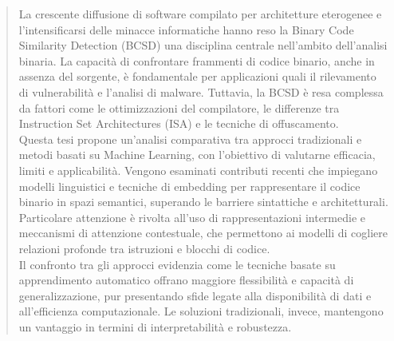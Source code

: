 \documentclass[12pt,a4paper,openright,twoside]{report}
\begin{document}

\restoregeometry


\newpage
\thispagestyle{empty}
\mbox{}
\newpage



\restoregeometry

\clearpage{\pagestyle{empty}\cleardoublepage}
\renewcommand{\abstractname}{Abstract}
{}
\begin{abstract}
   La crescente diffusione di software compilato per architetture eterogenee e l’intensificarsi delle minacce informatiche hanno reso la Binary Code Similarity Detection (BCSD) una disciplina centrale nell’ambito dell’analisi binaria. La capacità di confrontare frammenti di codice binario, anche in assenza del sorgente, è fondamentale per applicazioni quali il rilevamento di vulnerabilità e l’analisi di malware. Tuttavia, la BCSD è resa complessa da fattori come le ottimizzazioni del compilatore, le differenze tra Instruction Set Architectures (ISA) e le tecniche di offuscamento.\\ Questa tesi propone un’analisi comparativa tra approcci tradizionali e metodi basati su Machine Learning, con l’obiettivo di valutarne efficacia, limiti e applicabilità. Vengono esaminati contributi recenti che impiegano modelli linguistici e tecniche di embedding per rappresentare il codice binario in spazi semantici, superando le barriere sintattiche e architetturali. Particolare attenzione è rivolta all’uso di rappresentazioni intermedie e meccanismi di attenzione contestuale, che permettono ai modelli di cogliere relazioni profonde tra istruzioni e blocchi di codice. \\Il confronto tra gli approcci evidenzia come le tecniche basate su apprendimento automatico offrano maggiore flessibilità e capacità di generalizzazione, pur presentando sfide legate alla disponibilità di dati e all’efficienza computazionale. Le soluzioni tradizionali, invece, mantengono un vantaggio in termini di interpretabilità e robustezza.

\end{abstract}
\clearpage{\pagestyle{empty}\cleardoublepage}

\tableofcontents %
\rhead[\fancyplain{}{\bfseries\leftmark}]{\fancyplain{}{\bfseries\thepage}}
\end{document}
